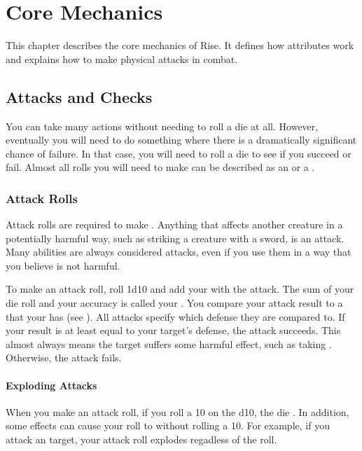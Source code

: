 \chapter{Core Mechanics}

This chapter describes the core mechanics of Rise.
It defines how attributes work and explains how to make physical attacks in combat.

\section{Attacks and Checks}\label{Attacks and Checks}
    You can take many actions without needing to roll a die at all.
    However, eventually you will need to do something where there is a dramatically significant chance of failure.
    In that case, you will need to roll a die to see if you succeed or fail.
    Almost all rolls you will need to make can be described as an  or a .

    \subsection{Attack Rolls}
        Attack rolls are required to make .
        Anything that affects another creature in a potentially harmful way, such as striking a creature with a sword, is an attack.
        Many abilities are always considered attacks, even if you use them in a way that you believe is not harmful.

        To make an attack roll, roll 1d10 and add your  with the attack.
        The sum of your die roll and your accuracy is called your .
        You compare your attack result to a  that your  has (see ).
        All attacks specify which defense they are compared to.
        If your result is at least equal to your target's defense, the attack succeeds.
        This almost always means the target suffers some harmful effect, such as taking .
        Otherwise, the attack fails.

        \subsubsection{Exploding Attacks}\label{Exploding Attacks}
            When you make an attack roll, if you roll a 10 on the d10, the die .
            In addition, some effects can cause your roll to  without rolling a 10.
            For example, if you attack an  target, your attack roll explodes regadless of the roll.

